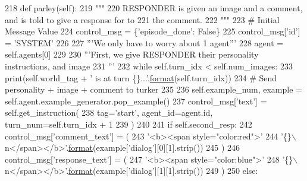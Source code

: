 \begin{DoxyCode}
218     \textcolor{keyword}{def }parley(self):
219         \textcolor{stringliteral}{"""}
220 \textcolor{stringliteral}{        RESPONDER is given an image and a comment, and is told to give a response for to}
221 \textcolor{stringliteral}{        the comment.}
222 \textcolor{stringliteral}{        """}
223         \textcolor{comment}{# Initial Message Value}
224         control\_msg = \{\textcolor{stringliteral}{'episode\_done'}: \textcolor{keyword}{False}\}
225         control\_msg[\textcolor{stringliteral}{'id'}] = \textcolor{stringliteral}{'SYSTEM'}
226 
227         \textcolor{stringliteral}{'''We only have to worry about 1 agent'''}
228         agent = self.agents[0]
229 
230         \textcolor{stringliteral}{'''First, we give RESPONDER their personality instructions, and image}
231 \textcolor{stringliteral}{        '''}
232         \textcolor{keywordflow}{while} self.turn\_idx < self.num\_images:
233             print(self.world\_tag + \textcolor{stringliteral}{' is at turn \{\}...'}.\hyperlink{namespaceparlai_1_1chat__service_1_1services_1_1messenger_1_1shared__utils_a32e2e2022b824fbaf80c747160b52a76}{format}(self.turn\_idx))
234             \textcolor{comment}{# Send personality + image + comment to turker}
235 
236             self.example\_num, example = self.agent.example\_generator.pop\_example()
237             control\_msg[\textcolor{stringliteral}{'text'}] = self.get\_instruction(
238                 tag=\textcolor{stringliteral}{'start'}, agent\_id=agent.id, turn\_num=self.turn\_idx + 1
239             )
240 
241             \textcolor{keywordflow}{if} self.second\_resp:
242                 control\_msg[\textcolor{stringliteral}{'comment\_text'}] = (
243                     \textcolor{stringliteral}{'<b><span style="color:red">'}
244                     \textcolor{stringliteral}{'\{\}\(\backslash\)n</span></b>'}.\hyperlink{namespaceparlai_1_1chat__service_1_1services_1_1messenger_1_1shared__utils_a32e2e2022b824fbaf80c747160b52a76}{format}(example[\textcolor{stringliteral}{'dialog'}][0][1].strip())
245                 )
246                 control\_msg[\textcolor{stringliteral}{'response\_text'}] = (
247                     \textcolor{stringliteral}{'<b><span style="color:blue">'}
248                     \textcolor{stringliteral}{'\{\}\(\backslash\)n</span></b>'}.\hyperlink{namespaceparlai_1_1chat__service_1_1services_1_1messenger_1_1shared__utils_a32e2e2022b824fbaf80c747160b52a76}{format}(example[\textcolor{stringliteral}{'dialog'}][1][1].strip())
249                 )
250             \textcolor{keywordflow}{else}:

\end{DoxyCode}

